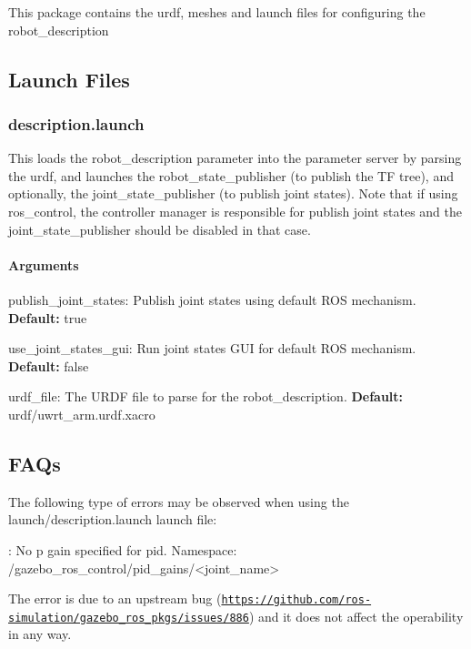 This package contains the urdf, meshes and launch files for configuring the robot\+\_\+description

\subsection*{Launch Files}

\subsubsection*{description.\+launch}

This loads the {\ttfamily robot\+\_\+description} parameter into the parameter server by parsing the urdf, and launches the {\ttfamily robot\+\_\+state\+\_\+publisher} (to publish the TF tree), and optionally, the {\ttfamily joint\+\_\+state\+\_\+publisher} (to publish joint states). Note that if using {\ttfamily ros\+\_\+control}, the controller manager is responsible for publish joint states and the {\ttfamily joint\+\_\+state\+\_\+publisher} should be disabled in that case.

\paragraph*{Arguments}


\begin{DoxyItemize}
\item {\ttfamily publish\+\_\+joint\+\_\+states}\+: Publish joint states using default R\+OS mechanism. {\bfseries Default\+:} {\ttfamily true}
\item {\ttfamily use\+\_\+joint\+\_\+states\+\_\+gui}\+: Run joint states G\+UI for default R\+OS mechanism. {\bfseries Default\+:} {\ttfamily false}
\item {\ttfamily urdf\+\_\+file}\+: The U\+R\+DF file to parse for the {\ttfamily robot\+\_\+description}. {\bfseries Default\+:} {\ttfamily urdf/uwrt\+\_\+arm.\+urdf.\+xacro}
\end{DoxyItemize}

\subsection*{F\+A\+Qs}


\begin{DoxyEnumerate}
\item The following type of errors may be observed when using the {\ttfamily launch/description.\+launch} launch file\+: \begin{DoxyVerb} [ERROR] [1549875853.096599133, 0.167000000]: No p gain specified for pid. Namespace: /gazebo_ros_control/pid_gains/<joint_name>
\end{DoxyVerb}


The error is due to an upstream bug (\href{https://github.com/ros-simulation/gazebo_ros_pkgs/issues/886}{\tt https\+://github.\+com/ros-\/simulation/gazebo\+\_\+ros\+\_\+pkgs/issues/886}) and it does not affect the operability in any way. 
\end{DoxyEnumerate}